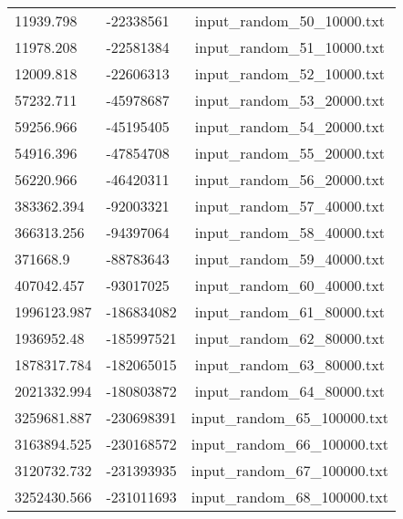 \begin{longtable}[hb]{|l|l|c|}
    11939.798 & -22338561 & input\_random\_50\_10000.txt \\
    11978.208 & -22581384 & input\_random\_51\_10000.txt \\
    12009.818 & -22606313 & input\_random\_52\_10000.txt \\
    57232.711 & -45978687 & input\_random\_53\_20000.txt \\
    59256.966 & -45195405 & input\_random\_54\_20000.txt \\
    54916.396 & -47854708 & input\_random\_55\_20000.txt \\
    56220.966 & -46420311 & input\_random\_56\_20000.txt \\
    383362.394 & -92003321 & input\_random\_57\_40000.txt \\
    366313.256 & -94397064 & input\_random\_58\_40000.txt \\
    371668.9 & -88783643 & input\_random\_59\_40000.txt \\
    407042.457 & -93017025 & input\_random\_60\_40000.txt \\
    1996123.987 & -186834082 & input\_random\_61\_80000.txt \\
    1936952.48 & -185997521 & input\_random\_62\_80000.txt \\
    1878317.784 & -182065015 & input\_random\_63\_80000.txt \\
    2021332.994 & -180803872 & input\_random\_64\_80000.txt \\
    3259681.887 & -230698391 & input\_random\_65\_100000.txt \\
    3163894.525 & -230168572 & input\_random\_66\_100000.txt \\
    3120732.732 & -231393935 & input\_random\_67\_100000.txt \\
    3252430.566 & -231011693 & input\_random\_68\_100000.txt \\
    \hline
\end{longtable}

